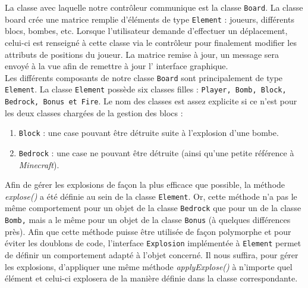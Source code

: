         La classe avec laquelle notre contrôleur communique est la classe 
        \texttt{Board}. La classe board crée une matrice remplie d'éléments 
        de type \texttt{Element} : joueurs, différents blocs, bombes, etc. 
        Lorsque l'utilisateur demande d'effectuer un déplacement, celui-ci 
        est renseigné à cette classe via le contr\^oleur pour finalement 
        modifier les attributs de positions du joueur. La matrice remise à 
        jour, un message sera envoyé à la vue afin de remettre à jour l'
        interface graphique.\\
        
        Les différents composants de notre classe \texttt{Board} sont principalement 
        de type \texttt{Element}. La classe \texttt{Element} possède six 
        classes filles : \texttt{Player, Bomb, Block, Bedrock, Bonus et Fire}.
        Le 
        nom des classes est assez explicite si ce n'est pour les deux classes 
        chargées de la gestion des blocs :
        \begin{enumerate}
        \item \texttt{Block} : une case pouvant \^etre détruite suite à l'explosion d'une bombe.
        \item \texttt{Bedrock} : une case ne pouvant \^etre détruite (ainsi 
        qu'une petite référence à \textit{Minecraft}).
        \end{enumerate}
        
        Afin de gérer les explosions de façon la plus efficace que possible, 
        la méthode \textit{explose()} a été définie au sein de la classe 
        \texttt{Element}. Or, cette méthode n'a pas le même comportement pour
        un objet de la classe \texttt{Bedrock} que pour un de la classe \texttt{Bomb,} 
        mais a le m\^eme pour un objet de la classe \texttt{Bonus} (à quelques différences près). 
        Afin que cette méthode puisse être utilisée de façon polymorphe et pour
        éviter les doublons de code, l'interface \texttt{Explosion} implémentée 
        à \texttt{Element} permet de définir un comportement adapté à l'objet
        concerné. Il nous suffira, pour gérer les explosions, d'appliquer une même méthode \textit{applyExplose()} à n’importe quel élément et celui-ci explosera de la manière définie dans la classe correspondante.\\
       
